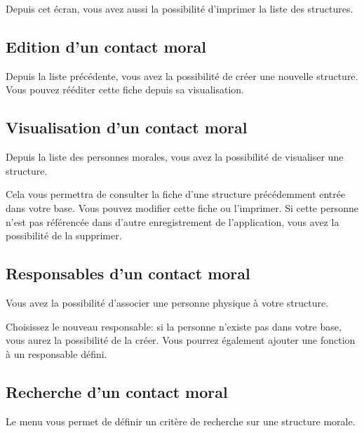 \documentclass[letterpaper,10pt,french]{sphinxmanual}
\begin{document}
Depuis cet écran, vous avez aussi la possibilité d’imprimer la liste des structures.

\noindent{}


\subsection{Edition d’un contact moral}
\label{\detokenize{contacts/legal_entity:edition-d-un-contact-moral}}
Depuis la liste précédente, vous avez la possibilité de créer une nouvelle structure. Vous pouvez ré\sphinxhyphen{}éditer cette fiche depuis sa visualisation.

\noindent{}


\subsection{Visualisation d’un contact moral}
\label{\detokenize{contacts/legal_entity:visualisation-d-un-contact-moral}}
Depuis la liste des personnes morales, vous avez la possibilité de visualiser une structure.

Cela vous permettra de consulter la fiche d’une structure précédemment entrée dans votre base. Vous pouvez modifier cette fiche ou l’imprimer. Si cette personne n’est pas référencée dans d’autre enregistrement de l’application, vous avez la possibilité de la supprimer.

\noindent{}


\subsection{Responsables d’un contact moral}
\label{\detokenize{contacts/legal_entity:responsables-d-un-contact-moral}}
Vous avez la possibilité d’associer une personne physique à votre structure.

Choisissez le nouveau responsable: si la personne n’existe pas dans votre base, vous aurez la possibilité de la créer. Vous pourrez également ajouter une fonction à un responsable défini.

\noindent{}


\subsection{Recherche d’un contact moral}
\label{\detokenize{contacts/legal_entity:recherche-d-un-contact-moral}}
Le menu  vous permet de définir un critère de recherche sur une structure morale.
\end{document}
